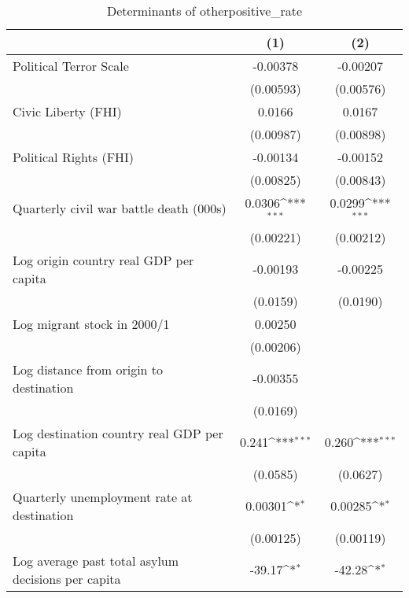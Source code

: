 \begin{table}[htbp]\centering
\def\sym#1{\ifmmode^{#1}\else\(^{#1}\)\fi}
\caption{Determinants of otherpositive\_rate}
\begin{tabular}{l*{2}{c}}
\hline\hline
                    &\multicolumn{1}{c}{(1)}         &\multicolumn{1}{c}{(2)}         \\
\hline
Political Terror Scale&    -0.00378         &    -0.00207         \\
                    &   (0.00593)         &   (0.00576)         \\
[1em]
Civic Liberty (FHI) &      0.0166         &      0.0167         \\
                    &   (0.00987)         &   (0.00898)         \\
[1em]
Political Rights (FHI)&    -0.00134         &    -0.00152         \\
                    &   (0.00825)         &   (0.00843)         \\
[1em]
Quarterly civil war battle death (000s)&      0.0306\sym{***}&      0.0299\sym{***}\\
                    &   (0.00221)         &   (0.00212)         \\
[1em]
Log origin country real GDP per capita&    -0.00193         &    -0.00225         \\
                    &    (0.0159)         &    (0.0190)         \\
[1em]
Log migrant stock in 2000/1&     0.00250         &                     \\
                    &   (0.00206)         &                     \\
[1em]
Log distance from origin to destination&    -0.00355         &                     \\
                    &    (0.0169)         &                     \\
[1em]
Log destination country real GDP per capita&       0.241\sym{***}&       0.260\sym{***}\\
                    &    (0.0585)         &    (0.0627)         \\
[1em]
Quarterly unemployment rate at destination&     0.00301\sym{*}  &     0.00285\sym{*}  \\
                    &   (0.00125)         &   (0.00119)         \\
[1em]
Log average past total asylum decisions per capita&      -39.17\sym{*}  &      -42.28\sym{*}  \\

\end{tabular}
\end{table}
